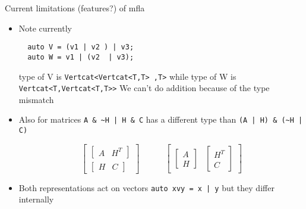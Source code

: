 \documentclass[9pt]{beamer}
\begin{document}
\begin{frame}[fragile]{Current limitations (features?) of mfla}

\begin{itemize}
 \item Note currently
  \begin{lstlisting}
  auto V = (v1 | v2 ) | v3;
  auto W = v1 | (v2  | v3);
  \end{lstlisting}
  type of V is  \lstinline|Vertcat<Vertcat<T,T> ,T>| while
  type of W is  \lstinline|Vertcat<T,Vertcat<T,T>>| We can't do addition because of the type mismatch

  \pause
\item Also  for matrices \lstinline$A & ~H | H & C$  has a different type than \lstinline$(A | H) & (~H | C)$

$$\begin{bmatrix} \begin{bmatrix} A  & H^T \end{bmatrix}  \\ \begin{bmatrix}  H  & C \end{bmatrix} \end{bmatrix} \quad\quad\quad
  \begin{bmatrix} \begin{bmatrix} A  \\ H \end{bmatrix}  & \begin{bmatrix}  H^T  \\ C \end{bmatrix} \end{bmatrix}
  $$
\pause
\item Both representations act on vectors \lstinline$auto xvy = x | y$ but they differ internally



\end{itemize}
\end{frame}
\end{document}
